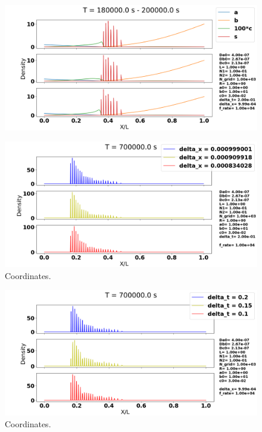 \documentclass[1p]{elsarticle}        	%
\begin{document}
\begin{figure}[h]
	\centering
	\includegraphics[width=\linewidth]{../figures/standard_settings_time.png}
	\caption{}
	\label{fig:coords}
\end{figure}

\begin{figure}
	\centering
	\includegraphics[width=\linewidth]{../figures/deltaX.png}
	\caption{Coordinates.}
	\label{fig:coords}
\end{figure}

\begin{figure}
	\centering
	\includegraphics[width=\linewidth]{../figures/deltaT.png}
	\caption{Coordinates.}
	\label{fig:coords}
\end{figure}
\end{document}
